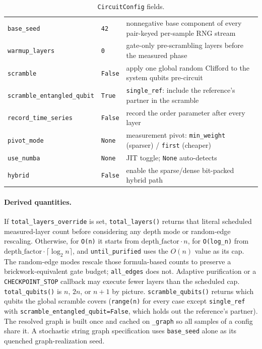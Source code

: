 \documentclass[11pt]{article}
\newcommand{\code}[1]{\texttt{#1}}
\begin{document}
\begin{table}[h]
\begin{tabular}{lll}
\code{base\_seed} & \code{42} & nonnegative base component of every pair-keyed per-sample RNG stream\\
\code{warmup\_layers} & \code{0} & gate-only pre-scrambling layers before the measured phase\\
\code{scramble} & \code{False} & apply one global random Clifford to the system qubits pre-circuit\\
\code{scramble\_entangled\_qubit} & \code{True} & \code{single\_ref}: include the reference's partner in the scramble\\
\code{record\_time\_series} & \code{False} & record the order parameter after every layer\\
\code{pivot\_mode} & \code{None} & measurement pivot: \code{min\_weight} (sparser) / \code{first} (cheaper)\\
\code{use\_numba} & \code{None} & JIT toggle; \code{None} auto-detects\\
\code{hybrid} & \code{False} & enable the sparse/dense bit-packed hybrid path\\
\bottomrule
\end{tabular}
\caption{\code{CircuitConfig} fields.}
\label{tab:config}
\end{table}

\paragraph{Derived quantities.} If \code{total\_layers\_override} is set, \code{total\_layers()} returns that
literal scheduled measured-layer count before considering any depth mode or random-edge rescaling. Otherwise, for
\code{O(n)} it starts from $\mathrm{depth\_factor}\cdot n$, for \code{O(log\_n)} from
$\mathrm{depth\_factor}\cdot\lceil\log_2 n\rceil$, and \code{until\_purified} uses the $O(n)$ value as its cap.
The random-edge modes rescale those formula-based counts to preserve a brickwork-equivalent gate budget;
\code{all\_edges} does not. Adaptive purification or a \code{CHECKPOINT\_STOP} callback may execute fewer layers
than the scheduled cap.
\code{total\_qubits()} is $n$, $2n$, or $n{+}1$ by picture. \code{scramble\_qubits()} returns which qubits the
global scramble covers (\code{range(n)} for every case except \code{single\_ref} with
\code{scramble\_entangled\_qubit=False}, which holds out the reference's partner). The resolved graph is built
once and cached on \code{\_graph} so all samples of a config share it. A stochastic string graph specification
uses \code{base\_seed} alone as its quenched graph-realization seed.
\end{document}
